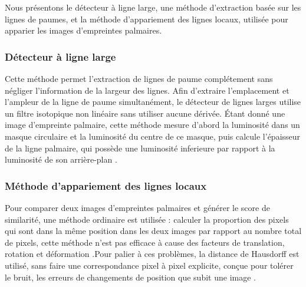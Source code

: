 Nous présentons le détecteur à ligne large, une méthode d’extraction basée sur les lignes de paumes, et la méthode d’appariement des lignes locaux, utilisée pour apparier les images d’empreintes palmaires.

\subsubsection{Détecteur à ligne large}
Cette méthode permet l’extraction de lignes de paume complétement sans négliger l’information de la largeur des lignes. Afin d’extraire l’emplacement et l’ampleur de la ligne de paume simultanément, le détecteur de lignes larges utilise un filtre isotopique non linéaire sans utiliser aucune dérivée.
Étant donné une image d’empreinte palmaire, cette méthode mesure d’abord la luminosité dans un masque circulaire et la luminosité du centre de ce masque, puis calcule l’épaisseur de la ligne palmaire, qui possède une luminosité inferieure par rapport à la luminosité de son arrière-plan \citep{liu2007detecting}. 
\subsubsection{Méthode d’appariement des lignes locaux}
Pour comparer deux images d’empreintes palmaires et générer le score de similarité, une méthode ordinaire est utilisée : calculer la proportion des pixels qui sont dans la même position dans les deux images par rapport au nombre total de pixels, cette méthode n’est pas efficace à cause des facteurs de translation, rotation et déformation \citep{zhang2012comparative}.Pour palier à ces problèmes, la distance de Hausdorff est utilisé, sans faire une correspondance pixel à pixel explicite, conçue pour tolérer le bruit, les erreurs de changements de position que subit une image \citep{rucklidge1997efficiently}.

